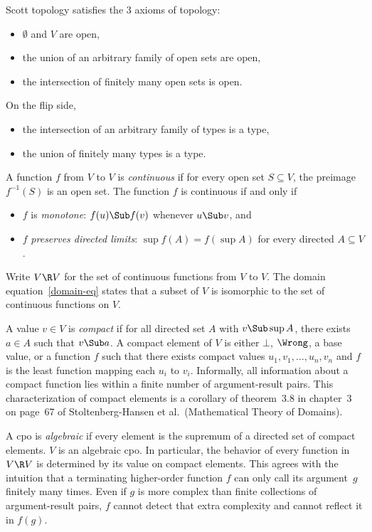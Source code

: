 \documentclass{amsart}
\theoremstyle{definition}
\begin{document}
Scott topology satisfies the 3 axioms of topology:
\begin{itemize}
\item $\emptyset$ and $V$ are open,
\item the union of an arbitrary family of open sets are open,
\item the intersection of finitely many open sets is open.
\end{itemize}

On the flip side,
\begin{itemize}
\item the intersection of an arbitrary family of types is a type,
\item the union of finitely many types is a type.
\end{itemize}

A function $f$ from $V$ to $V$ is \emph{continuous} if for every
open set $S\subseteq V$, the preimage $f^{-1}(S)$ is an open set.
The function $f$ is continuous if and only if
\begin{itemize}
\item $f$ is \emph{monotone}: $f(u)\Sub f(v)$ whenever $u\Sub v$,
and
\item $f$ \emph{preserves directed limits}: $\sup f(A) = f(\sup
A)$ for every directed $A\subseteq V$.
\end{itemize}
Write $V\R V$ for the set of continuous functions from $V$ to
$V$. The domain equation~\eqref{domain-eq} states that a subset
of $V$ is isomorphic to the set of continuous functions on $V$.

A value $v\in V$ is \emph{compact} if for all directed set $A$
with $v\Sub\sup A$, there exists $a\in A$ such that $v\Sub a$. A
compact element of $V$ is either $\bot$, $\Wrong$, a base value,
or a function $f$ such that there exists compact values
$u_1,v_1,\ldots,u_n,v_n$ and $f$ is the least function mapping
each $u_i$ to $v_i$. Informally, all information about a compact
function lies within a finite number of argument-result pairs.
This characterization of compact elements is a corollary of
theorem~3.8 in chapter~3 on page~67 of Stoltenberg-Hansen et al.\
(Mathematical Theory of Domains).

A cpo is \emph{algebraic} if every element is the supremum of a
directed set of compact elements. $V$ is an algebraic cpo. In
particular, the behavior of every function in $V\R V$ is
determined by its value on compact elements. This agrees with the
intuition that a terminating higher-order function $f$ can only
call its argument~$g$ finitely many times. Even if $g$ is more
complex than finite collections of argument-result pairs, $f$
cannot detect that extra complexity and cannot reflect it in
$f(g)$.
\end{document}
